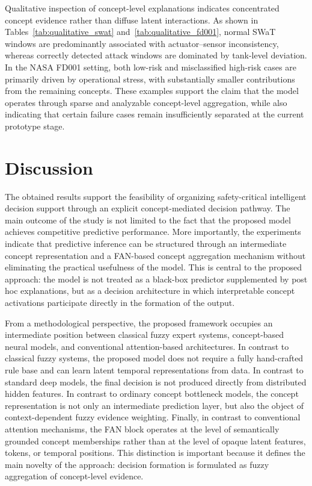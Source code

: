 \documentclass[runningheads]{llncs}
\begin{document}
Qualitative inspection of concept-level explanations indicates concentrated concept evidence rather than diffuse latent interactions. As shown in Tables~\ref{tab:qualitative_swat} and~\ref{tab:qualitative_fd001}, normal SWaT windows are predominantly associated with actuator--sensor inconsistency, whereas correctly detected attack windows are dominated by tank-level deviation. In the NASA FD001 setting, both low-risk and misclassified high-risk cases are primarily driven by operational stress, with substantially smaller contributions from the remaining concepts. These examples support the claim that the model operates through sparse and analyzable concept-level aggregation, while also indicating that certain failure cases remain insufficiently separated at the current prototype stage.

\section{Discussion}

The obtained results support the feasibility of organizing safety-critical intelligent decision support through an explicit concept-mediated decision pathway. The main outcome of the study is not limited to the fact that the proposed model achieves competitive predictive performance. More importantly, the experiments indicate that predictive inference can be structured through an intermediate concept representation and a FAN-based concept aggregation mechanism without eliminating the practical usefulness of the model. This is central to the proposed approach: the model is not treated as a black-box predictor supplemented by post hoc explanations, but as a decision architecture in which interpretable concept activations participate directly in the formation of the output.

From a methodological perspective, the proposed framework occupies an intermediate position between classical fuzzy expert systems, concept-based neural models, and conventional attention-based architectures. In contrast to classical fuzzy systems, the proposed model does not require a fully hand-crafted rule base and can learn latent temporal representations from data. In contrast to standard deep models, the final decision is not produced directly from distributed hidden features. In contrast to ordinary concept bottleneck models, the concept representation is not only an intermediate prediction layer, but also the object of context-dependent fuzzy evidence weighting. Finally, in contrast to conventional attention mechanisms, the FAN block operates at the level of semantically grounded concept memberships rather than at the level of opaque latent features, tokens, or temporal positions. This distinction is important because it defines the main novelty of the approach: decision formation is formulated as fuzzy aggregation of concept-level evidence.
\end{document}
